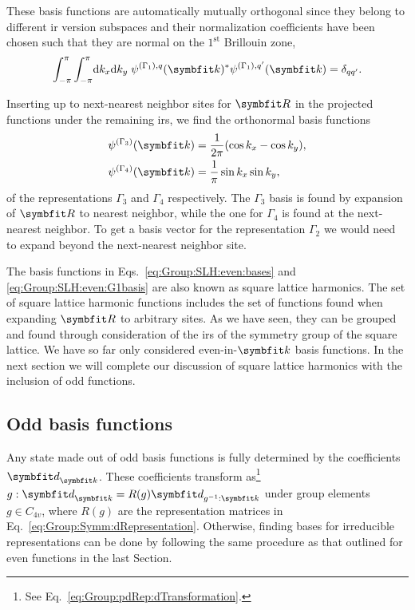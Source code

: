 These basis functions are automatically
mutually orthogonal since they belong to different \ac{ir} version subspaces and their normalization coefficients have been chosen such that they are normal
on the $1^\text{st}$ Brillouin zone, \ie
\begin{equation}
    \label{eq:Group:SLH:even:G1orthonormal}
    \int_{-\pi}^\pi\int_{-\pi}^\pi\!\textrm{d}k_x\textrm{d}k_y\;\psi^{(\Gamma_1),q}(\v{k})^\ast\psi^{(\Gamma_1),q'}(\v{k}) = \delta_{qq'}.
\end{equation}

Inserting up to next-nearest neighbor sites for $\v{R}$ in the projected functions under the remaining \ac{ir}s, we find the orthonormal basis 
functions
\begin{subequations}
    \label{eq:Group:SLH:even:bases}
    \begin{align}
        \label{eq:Group:SLH:even:bases:G3}
        \psi^{(\Gamma_3)}(\v{k}) &= \frac{1}{2\pi}(\cos k_x - \cos k_y),\\
        \label{eq:Group:SLH:even:bases:G4}
        \psi^{(\Gamma_4)}(\v{k}) &= \frac{1}{\pi}\sin k_x\sin k_y,
    \end{align}
\end{subequations}
of the representations $\Gamma_3$ and $\Gamma_4$ respectively. The $\Gamma_3$ basis is found by expansion of $\v{R}$ to nearest neighbor, while the one for $\Gamma_4$
is found at the next-nearest neighbor. To get a basis vector for the representation $\Gamma_2$ we would need to expand beyond the next-nearest neighbor site.

The basis functions in Eqs.~\eqref{eq:Group:SLH:even:bases} and \eqref{eq:Group:SLH:even:G1basis} are also known as square lattice harmonics.
The set of square lattice harmonic functions includes the set of functions found when expanding
$\v{R}$ to arbitrary sites. As we have seen, they can be grouped and found through consideration of the \ac{ir}s of the symmetry group of the
square lattice. We have so far only considered even-in-$\v{k}$ basis functions. In the next section we will complete our discussion of square lattice harmonics
with the inclusion of odd functions.


\subsection{Odd basis functions}

Any state made out of odd basis functions is fully determined by the coefficients $\v{d}_\v{k}$. These coefficients
transform as\footnote{See Eq.~\eqref{eq:Group:pdRep:dTransformation}.} $g:\v{d}_\v{k} = R(g)\v{d}_{g^{-1}:\v{k}}$
under group elements $g\in C_{4v}$, where $R(g)$ are the representation matrices in Eq.~\eqref{eq:Group:Symm:dRepresentation}.
Otherwise, finding bases for irreducible representations can be done by following the same procedure as that outlined for even functions in the last Section.

